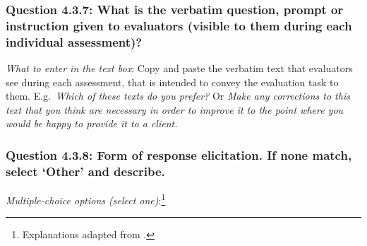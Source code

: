 \documentclass[11pt,a4paper]{article}
\begin{document}
\subsubsection*{Question 4.3.7:  What is the verbatim question, prompt or instruction given to evaluators (visible to them during each individual assessment)?  }

\noindent\textit{What to enter in the text box}:  Copy and paste the verbatim text that evaluators see during each assessment, that is intended to convey the evaluation task to them. E.g.\ \textit{Which of these texts do you prefer?} Or \textit{Make any corrections to this text that you think are necessary in order to improve it to the point where you would be happy to provide it to a client.} 

\subsubsection*{Question 4.3.8:  Form of response elicitation. If none match, select `Other' and describe.}

\noindent\textit{Multiple-choice options (select one)}:\footnote{Explanations adapted from \citet{howcroft-etal-2020-twenty}.}
\vspace{-.1cm}
\end{document}
